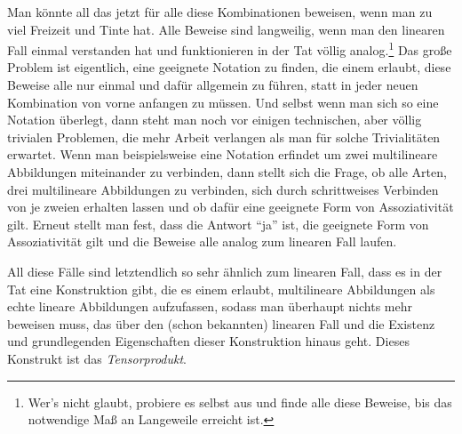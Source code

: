 \begin{remark}
\medbreak
Man könnte all das jetzt für alle diese Kombinationen beweisen, wenn man zu viel Freizeit und Tinte hat. Alle Beweise sind langweilig, wenn man den linearen Fall einmal verstanden hat und funktionieren in der Tat völlig analog.\footnote{Wer's nicht glaubt, probiere es selbst aus und finde alle diese Beweise, bis das notwendige Maß an Langeweile erreicht ist.} Das große Problem ist eigentlich, eine geeignete Notation zu finden, die einem erlaubt, diese Beweise alle nur einmal und dafür allgemein zu führen, statt in jeder neuen Kombination von vorne anfangen zu müssen. Und selbst wenn man sich so eine Notation überlegt, dann steht man noch vor einigen technischen, aber völlig trivialen Problemen, die mehr Arbeit verlangen als man für solche Trivialitäten erwartet. Wenn man beispielsweise eine Notation erfindet um zwei multilineare Abbildungen miteinander zu verbinden, dann stellt sich die Frage, ob alle Arten, drei multilineare Abbildungen zu verbinden, sich durch schrittweises Verbinden von je zweien erhalten lassen und ob dafür eine geeignete Form von Assoziativität gilt. Erneut stellt man fest, dass die Antwort \enquote{ja} ist, die geeignete Form von Assoziativität gilt und die Beweise alle analog zum linearen Fall laufen.
\end{remark}

\begin{remark}
All diese Fälle sind letztendlich so sehr ähnlich zum linearen Fall, dass es in der Tat eine Konstruktion gibt, die es einem erlaubt, multilineare Abbildungen als echte lineare Abbildungen aufzufassen, sodass man überhaupt nichts mehr beweisen muss, das über den (schon bekannten) linearen Fall und die Existenz und grundlegenden Eigenschaften dieser Konstruktion hinaus geht. Dieses Konstrukt ist das \emph{Tensorprodukt}.
\end{remark}

